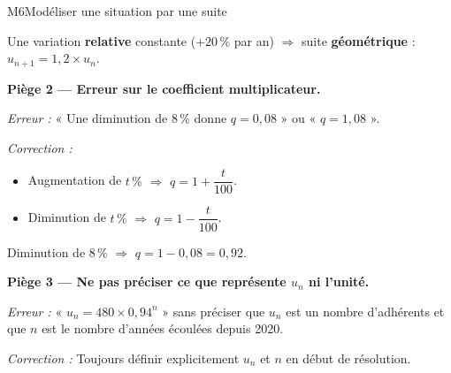 \begin{fichemethode}{M6}{Modéliser une situation par une suite}
{Une variation \textbf{relative} constante ($+20\,\%$ par an) $\Rightarrow$ suite \textbf{géométrique} : $u_{n+1} = 1{,}2 \times u_n$.

\medskip
\textbf{Piège 2 — Erreur sur le coefficient multiplicateur.}

\textit{Erreur :} « Une diminution de $8\,\%$ donne $q = 0{,}08$ » ou « $q = 1{,}08$ ».

\textit{Correction :}
\begin{itemize}
  \item Augmentation de $t\,\%$ $\Rightarrow$ $q = 1 + \dfrac{t}{100}$.
  \item Diminution de $t\,\%$ $\Rightarrow$ $q = 1 - \dfrac{t}{100}$.
\end{itemize}
Diminution de $8\,\%$ $\Rightarrow$ $q = 1 - 0{,}08 = 0{,}92$.

\medskip
\textbf{Piège 3 — Ne pas préciser ce que représente $u_n$ ni l'unité.}

\textit{Erreur :} « $u_n = 480 \times 0{,}94^n$ » sans préciser que $u_n$ est un nombre d'adhérents et que $n$ est le nombre d'années écoulées depuis 2020.

\textit{Correction :} Toujours définir explicitement $u_n$ et $n$ en début de résolution.
}



\end{fichemethode}

